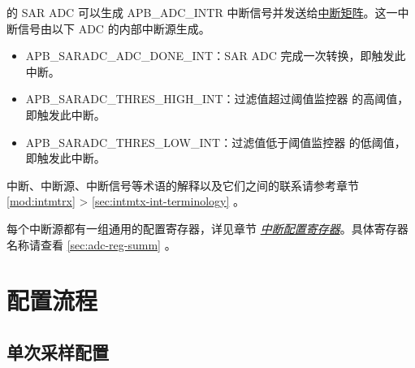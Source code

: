 \documentclass[main\_\_CN.tex]{subfiles}
\begin{document}
\chipname{} 的 SAR ADC 可以生成 APB\_ADC\_INTR 中断信号并发送给\hyperref[mod:intmtrx]{中断矩阵}。这一中断信号由以下 ADC 的内部中断源生成。

\begin{itemize}
    \item \label{int:SARADCDONEINT1} APB\_SARADC\_ADC\_DONE\_INT：SAR ADC 完成一次转换，即触发此中断。
    \item \label{int:APBSARADCTHRESxHIGHINT} APB\_SARADC\_THRES\_HIGH\_INT：过滤值超过阈值监控器  的高阈值，即触发此中断。
    \item \label{int:APBSARADCTHRESxLOWINT} APB\_SARADC\_THRES\_LOW\_INT：过滤值低于阈值监控器  的低阈值，即触发此中断。
\end{itemize}

\begin{tiplisting}
中断、中断源、中断信号等术语的解释以及它们之间的联系请参考章节 \ref{mod:intmtrx} \textit{} > \ref{sec:intmtx-int-terminology} \textit{}。
\end{tiplisting}

每个中断源都有一组通用的配置寄存器，详见章节 \hyperref[interrupt-config-registers]{\textit{中断配置寄存器}}。具体寄存器名称请查看 \ref{sec:adc-reg-summ} \textit{}。



\section{配置流程}
\label{sec:adc_programming_procedure}

\subsection{单次采样配置}
\end{document}

